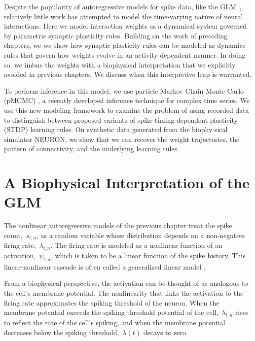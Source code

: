 Despite the popularity of autoregressive models for spike data, like 
the GLM~\cite{Paninski-2004, Truccolo-2005, Pillow-2008},
relatively little work has attempted to model the time-varying nature
of neural interactions.  Here we model interaction weights as a
dynamical system governed by parametric synaptic plasticity rules. 
Building on the work of preceding chapters, 
we we show how synaptic plasticity rules can be modeled as dynamics 
rules that govern how weights evolve in an activity-dependent manner.
In doing so, we imbue the weights with a biophysical interpretation 
that we explicitly avoided in previous chapters. We discuss when this
interpretive leap is warranted. 

To perform inference in this model, we use particle Markov Chain Monte
Carlo (pMCMC) \cite{Andrieu-2010}, a recently developed inference
technique for complex time series.  We use this new modeling framework
to examine the problem of using recorded data to distinguish between
proposed variants of spike-timing-dependent plasticity (STDP) learning
rules. On synthetic data generated from the biophy sical simulator
NEURON, we show that we can recover the weight trajectories, the
pattern of connectivity, and the underlying learning rules.

\section{A Biophysical Interpretation of the GLM}
The nonlinear autoregressive models of the previous chapter 
treat the spike count,~$s_{t,n}$, as a random variable whose 
distribution depends on a non-negative firing rate,~$\lambda_{t,n}$.
The firing rate is modeled as a nonlinear function of an activation,~$\psi_{t,n}$,
which is taken to be a linear function of the spike history.
This linear-nonlinear cascade is often called a generalized linear model 
\cite{Paninski-2004, Truccolo-2005}.

From a biophysical perspective, the activation can be thought of as 
analogous to the cell's membrane potential. The nonlinearity that 
links the activation to the firing rate approximates the spiking 
threshold of the neuron.
 When the membrane potential exceeds the spiking threshold
potential of the cell,~$\lambda_{t,n}$ rises to reflect the rate of the
cell's spiking, and when the membrane potential decreases below the
spiking threshold,~$\lambda(t)$ decays to zero. 

